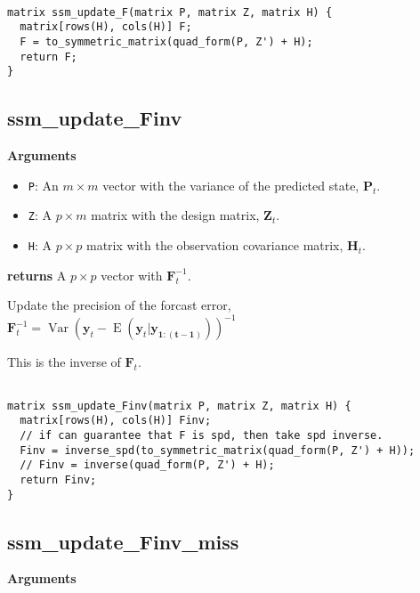 \documentclass[]{book}
\providecommand{\tightlist}{%
  \setlength{\itemsep}{0pt}\setlength{\parskip}{0pt}}
\DeclareMathOperator{\E}{E}
\DeclareMathOperator{\Var}{Var}
\newcommand{\mat}[1]{\boldsymbol{#1}}
\renewcommand{\vec}[1]{\boldsymbol{#1}}
\begin{document}
\begin{verbatim}

matrix ssm_update_F(matrix P, matrix Z, matrix H) {
  matrix[rows(H), cols(H)] F;
  F = to_symmetric_matrix(quad_form(P, Z') + H);
  return F;
}

\end{verbatim}

\subsection{ssm\_update\_Finv}\label{ssm_update_finv}

\textbf{Arguments}

\begin{itemize}
\tightlist
\item
  \texttt{P}: An \(m \times m\) vector with the variance of the
  predicted state, \(\mat{P}_t\).
\item
  \texttt{Z}: A \(p \times m\) matrix with the design matrix,
  \(\mat{Z}_t\).
\item
  \texttt{H}: A \(p \times p\) matrix with the observation covariance
  matrix, \(\mat{H}_t\).
\end{itemize}

\textbf{returns} A \(p \times p\) vector with \(\mat{F}^{-1}_t\).

Update the precision of the forcast error,
\(\mat{F}^{-1}_t = \Var(\vec{y}_t - \E(\vec{y}_t | \vec{y_{1:(t - 1)}}))^{-1}\)

This is the inverse of \(\mat{F}_t\).

\begin{verbatim}

matrix ssm_update_Finv(matrix P, matrix Z, matrix H) {
  matrix[rows(H), cols(H)] Finv;
  // if can guarantee that F is spd, then take spd inverse.
  Finv = inverse_spd(to_symmetric_matrix(quad_form(P, Z') + H));
  // Finv = inverse(quad_form(P, Z') + H);
  return Finv;
}

\end{verbatim}

\subsection{ssm\_update\_Finv\_miss}\label{ssm_update_finv_miss}

\textbf{Arguments}
\end{document}
